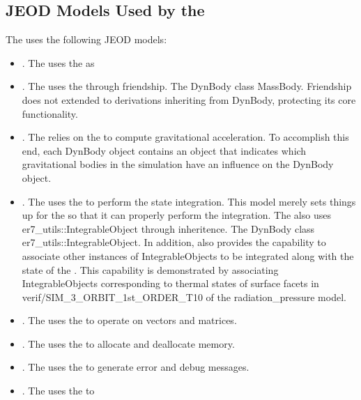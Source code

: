 \subsection*{JEOD Models Used by the \ModelDesc}
The \ModelDesc uses the following JEOD models:
\begin{itemize}
\item{}. The \ModelDesc uses the \DYNMANAGER as
\item{}. The \ModelDesc uses the \MASS through friendship.
The DynBody class \hasa MassBody. Friendship does not extended to derivations
 inheriting from DynBody, protecting its core functionality.
\item{}. The \ModelDesc relies on the \GRAVITY to
  compute gravitational acceleration. To accomplish this end, each DynBody
  object contains an object that indicates which gravitational bodies in the
  simulation have an influence on the DynBody object.
\item{}. The \ModelDesc uses the \INTEGRATION to
  perform the state integration. This model merely sets things up for the
  \INTEGRATION so that it can properly perform the integration. The \ModelDesc
    also uses er7\_utils::IntegrableObject through inheritence. The DynBody
    class \isa er7\_utils::IntegrableObject.  In addition, \ModelDesc also
    provides the capability to associate other instances of IntegrableObjects
    to be integrated along with the state of the \ModelDesc. This capability
    is demonstrated by associating IntegrableObjects corresponding to thermal
    states of surface facets in verif/SIM\_3\_ORBIT\_1st\_ORDER\_T10 of the
    radiation\_pressure model.
\item{}. The \ModelDesc uses the \MATH to operate on
  vectors and matrices.
\item{}. The \ModelDesc uses the \MEMORY to allocate
  and deallocate memory.
\item{}. The \ModelDesc uses the \MESSAGE to generate
  error and debug messages.
\item{}. The \ModelDesc uses the \NAMEDITEM to

\end{itemize}
